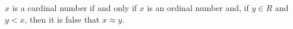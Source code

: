 $x$ is a cardinal number if and only if $x$ is an ordinal number and, if $y \in R$ and $y < x$, then it is false that $x \approx y$.

